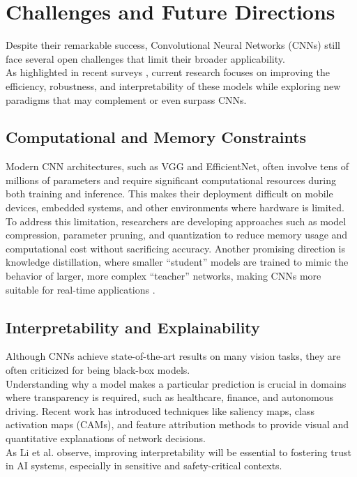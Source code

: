 \chapter{Challenges and Future Directions}

Despite their remarkable success, Convolutional Neural Networks (CNNs) still face several open challenges that limit their broader applicability. 
\\
As highlighted in recent surveys \cite{li2021survey, zhao2024review}, current research focuses on improving the efficiency, robustness, and interpretability of these models while exploring new paradigms that may complement or even surpass CNNs.

\section{Computational and Memory Constraints}

Modern CNN architectures, such as VGG and EfficientNet, often involve tens of millions of parameters and require significant computational resources during both training and inference. 
This makes their deployment difficult on mobile devices, embedded systems, and other environments where hardware is limited.  
\\
To address this limitation, researchers are developing approaches such as model compression, parameter pruning, and quantization to reduce memory usage and computational cost without sacrificing accuracy. Another promising direction is knowledge distillation, where smaller “student” models are trained to mimic the behavior of larger, more complex “teacher” networks, making CNNs more suitable for real-time applications \cite{zhao2024review}.

\section{Interpretability and Explainability}

Although CNNs achieve state-of-the-art results on many vision tasks, they are often criticized for being black-box models.
\\
Understanding why a model makes a particular prediction is crucial in domains where transparency is required, such as healthcare, finance, and autonomous driving.  
Recent work has introduced techniques like saliency maps, class activation maps (CAMs), and feature attribution methods to provide visual and quantitative explanations of network decisions. 
\\
As Li et al. \cite{li2021survey} observe, improving interpretability will be essential to fostering trust in AI systems, especially in sensitive and safety-critical contexts.

